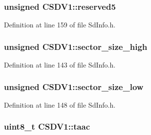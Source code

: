 \subsubsection[{\texorpdfstring{reserved5}{reserved5}}]{\setlength{\rightskip}{0pt plus 5cm}unsigned C\+S\+D\+V1\+::reserved5}\hypertarget{struct_c_s_d_v1_ab19ce641d4e1ed12241f3519836c30dc}{}\label{struct_c_s_d_v1_ab19ce641d4e1ed12241f3519836c30dc}


Definition at line 159 of file Sd\+Info.\+h.

\subsubsection[{\texorpdfstring{sector\+\_\+size\+\_\+high}{sector\_size\_high}}]{\setlength{\rightskip}{0pt plus 5cm}unsigned C\+S\+D\+V1\+::sector\+\_\+size\+\_\+high}\hypertarget{struct_c_s_d_v1_acfeaa8dfeb8c792f3e1e43d442affaf1}{}\label{struct_c_s_d_v1_acfeaa8dfeb8c792f3e1e43d442affaf1}


Definition at line 143 of file Sd\+Info.\+h.

\subsubsection[{\texorpdfstring{sector\+\_\+size\+\_\+low}{sector\_size\_low}}]{\setlength{\rightskip}{0pt plus 5cm}unsigned C\+S\+D\+V1\+::sector\+\_\+size\+\_\+low}\hypertarget{struct_c_s_d_v1_ad0784917ed048a2e751dcc3e82d7857f}{}\label{struct_c_s_d_v1_ad0784917ed048a2e751dcc3e82d7857f}


Definition at line 148 of file Sd\+Info.\+h.

\subsubsection[{\texorpdfstring{taac}{taac}}]{\setlength{\rightskip}{0pt plus 5cm}uint8\+\_\+t C\+S\+D\+V1\+::taac}\hypertarget{struct_c_s_d_v1_a80833a500dfa8f2292514969d7c55fd4}{}\label{struct_c_s_d_v1_a80833a500dfa8f2292514969d7c55fd4}


